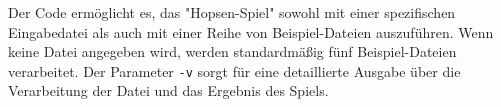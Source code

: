 \documentclass[a4paper,10pt,ngerman]{scrartcl}
\begin{document}
	Der Code ermöglicht es, das "Hopsen-Spiel" sowohl mit einer spezifischen Eingabedatei als auch mit einer Reihe von Beispiel-Dateien auszuführen. Wenn keine Datei angegeben wird, werden standardmäßig fünf Beispiel-Dateien verarbeitet. Der Parameter \texttt{-v} sorgt für eine detaillierte Ausgabe über die Verarbeitung der Datei und das Ergebnis des Spiels.
	
	
\end{document}
